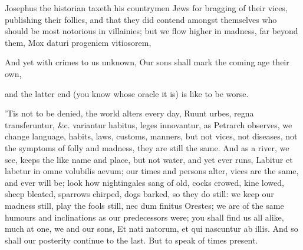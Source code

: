 {Josephus the historian taxeth his countrymen Jews for bragging of
their vices, publishing their follies, and that they did contend
amongst themselves who should be most notorious in villainies; but we
flow higher in madness, far beyond them,
Mox daturi progeniem vitiosorem,

And yet with crimes to us unknown,
Our sons shall mark the coming age their own,

and the latter end (you know whose oracle it is) is like to be worse.

'Tis not to be denied, the world alters every day, Ruunt urbes, regna
transferuntur, \&c. variantur habitus, leges innovantur, as
Petrarch observes, we change language, habits, laws, customs,
manners, but not vices, not diseases, not the symptoms of folly and
madness, they are still the same. And as a river, we see, keeps the
like name and place, but not water, and yet ever runs, Labitur et
labetur in omne volubilis aevum; our times and persons alter, vices are
the same, and ever will be; look how nightingales sang of old, cocks
crowed, kine lowed, sheep bleated, sparrows chirped, dogs barked, so
they do still: we keep our madness still, play the fools still, nec dum
finitus Orestes; we are of the same humours and inclinations as our
predecessors were; you shall find us all alike, much at one, we and our
sons, Et nati natorum, et qui nascuntur ab illis. And so shall our
posterity continue to the last. But to speak of times present.

}
